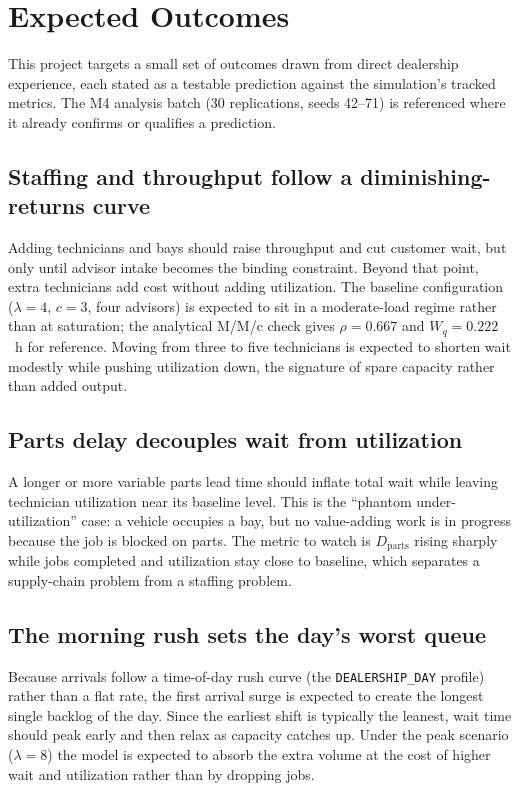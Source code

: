 \documentclass[conference]{IEEEtran}
\begin{document}
\section{Expected Outcomes}
This project targets a small set of outcomes drawn from direct dealership
experience, each stated as a testable prediction against the simulation's
tracked metrics. The M4 analysis batch (30 replications, seeds 42--71) is
referenced where it already confirms or qualifies a prediction.

\subsection{Staffing and throughput follow a diminishing-returns curve}
Adding technicians and bays should raise throughput and cut customer wait,
but only until advisor intake becomes the binding constraint. Beyond that
point, extra technicians add cost without adding utilization. The baseline
configuration ($\lambda = 4$, $c = 3$, four advisors) is expected to sit in a
moderate-load regime rather than at saturation; the analytical M/M/c check
gives $\rho = 0.667$ and $W_q = 0.222$~h for reference. Moving from three to
five technicians is expected to shorten wait modestly while pushing
utilization down, the signature of spare capacity rather than added output.

\subsection{Parts delay decouples wait from utilization}
A longer or more variable parts lead time should inflate total wait while
leaving technician utilization near its baseline level. This is the
``phantom under-utilization'' case: a vehicle occupies a bay, but no
value-adding work is in progress because the job is blocked on parts. The
metric to watch is $D_{\text{parts}}$ rising sharply while jobs completed and
utilization stay close to baseline, which separates a supply-chain problem
from a staffing problem.

\subsection{The morning rush sets the day's worst queue}
Because arrivals follow a time-of-day rush curve (the \texttt{DEALERSHIP\_DAY}
profile) rather than a flat rate, the first arrival surge is expected to
create the longest single backlog of the day. Since the earliest shift is
typically the leanest, wait time should peak early and then relax as capacity
catches up. Under the peak scenario ($\lambda = 8$) the model is expected to
absorb the extra volume at the cost of higher wait and utilization rather
than by dropping jobs.
\end{document}
